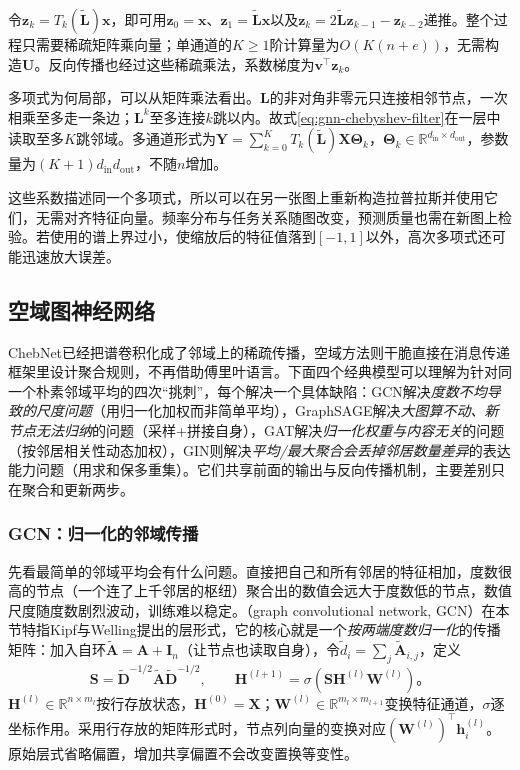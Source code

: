 令$\bm{z}_k=T_k(\widetilde{\bm{L}})\bm{x}$，即可用$\bm{z}_0=\bm{x}$、$\bm{z}_1=\widetilde{\bm{L}}\bm{x}$以及$\bm{z}_k=2\widetilde{\bm{L}}\bm{z}_{k-1}-\bm{z}_{k-2}$递推。整个过程只需要稀疏矩阵乘向量；单通道的$K\geq1$阶计算量为$O(K(n+e))$，无需构造$\bm{U}$。反向传播也经过这些稀疏乘法，系数梯度为$\bm{v}^{\top}\bm{z}_k$。

多项式为何局部，可以从矩阵乘法看出。$\bm{L}$的非对角非零元只连接相邻节点，一次相乘至多走一条边；$\bm{L}^k$至多连接$k$跳以内。故式\eqref{eq:gnn-chebyshev-filter}在一层中读取至多$K$跳邻域。多通道形式为$\bm{Y}=\sum_{k=0}^{K}T_k(\widetilde{\bm{L}})\bm{X}\bm{\Theta}_k$，$\bm{\Theta}_k\in\mathbb{R}^{d_{\mathrm{in}}\times d_{\mathrm{out}}}$，参数量为$(K+1)d_{\mathrm{in}}d_{\mathrm{out}}$，不随$n$增加。

这些系数描述同一个多项式，所以可以在另一张图上重新构造拉普拉斯并使用它们，无需对齐特征向量。频率分布与任务关系随图改变，预测质量也需在新图上检验。若使用的谱上界过小，使缩放后的特征值落到$[-1,1]$以外，高次多项式还可能迅速放大误差。

\subsection{空域图神经网络}
\label{sec:gnn-spatial}

ChebNet已经把谱卷积化成了邻域上的稀疏传播，空域方法则干脆直接在消息传递框架里设计聚合规则，不再借助傅里叶语言。下面四个经典模型可以理解为针对同一个朴素邻域平均的四次“挑刺”，每个解决一个具体缺陷：GCN解决\emph{度数不均导致的尺度问题}（用归一化加权而非简单平均），GraphSAGE解决\emph{大图算不动、新节点无法归纳}的问题（采样+拼接自身），GAT解决\emph{归一化权重与内容无关}的问题（按邻居相关性动态加权），GIN则解决\emph{平均/最大聚合会丢掉邻居数量差异}的表达能力问题（用求和保多重集）。它们共享前面的输出与反向传播机制，主要差别只在聚合和更新两步。

\subsubsection{GCN：归一化的邻域传播}
\label{sec:gnn-gcn}

先看最简单的邻域平均会有什么问题。直接把自己和所有邻居的特征相加，度数很高的节点（一个连了上千邻居的枢纽）聚合出的数值会远大于度数低的节点，数值尺度随度数剧烈波动，训练难以稳定。（graph convolutional network, GCN）在本节特指Kipf与Welling提出的层形式，它的核心就是一个\emph{按两端度数归一化}的传播矩阵：加入自环$\widetilde{\bm{A}}=\bm{A}+\bm{I}_n$（让节点也读取自身），令$\widetilde d_i=\sum_j\widetilde{\bm{A}}_{i,j}$，定义
\begin{equation}
  \bm{S}=\widetilde{\bm{D}}^{-1/2}\widetilde{\bm{A}}\widetilde{\bm{D}}^{-1/2},
  \qquad
  \bm{H}^{(l+1)}=\sigma\!\left(\bm{S}\bm{H}^{(l)}\bm{W}^{(l)}\right)\text{。}
  \label{eq:gnn-gcn-layer}
\end{equation}
$\bm{H}^{(l)}\in\mathbb{R}^{n\times m_l}$按行存放状态，$\bm{H}^{(0)}=\bm{X}$；$\bm{W}^{(l)}\in\mathbb{R}^{m_l\times m_{l+1}}$变换特征通道，$\sigma$逐坐标作用。采用行存放的矩阵形式时，节点列向量的变换对应$(\bm{W}^{(l)})^{\top}\bm{h}_i^{(l)}$。原始层式省略偏置，增加共享偏置不会改变置换等变性。

